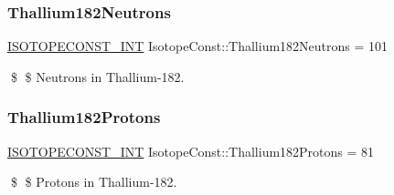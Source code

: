 \subsubsection{\texorpdfstring{Thallium182\+Neutrons}{Thallium182Neutrons}}
{\footnotesize\ttfamily \mbox{\hyperlink{group___isotope_const-_macros_ga5f18360b3e99483a35c32d789e62621c}{I\+S\+O\+T\+O\+P\+E\+C\+O\+N\+S\+T\+\_\+\+I\+NT}} Isotope\+Const\+::\+Thallium182\+Neutrons = 101}

\$ \$ Neutrons in Thallium-\/182. \mbox{\label{group___isotope_const-_thallium-_tl182_ga473d874e5cd9b1ccc34fa555c32c7652}} 
\subsubsection{\texorpdfstring{Thallium182\+Protons}{Thallium182Protons}}
{\footnotesize\ttfamily \mbox{\hyperlink{group___isotope_const-_macros_ga5f18360b3e99483a35c32d789e62621c}{I\+S\+O\+T\+O\+P\+E\+C\+O\+N\+S\+T\+\_\+\+I\+NT}} Isotope\+Const\+::\+Thallium182\+Protons = 81}

\$ \$ Protons in Thallium-\/182. 